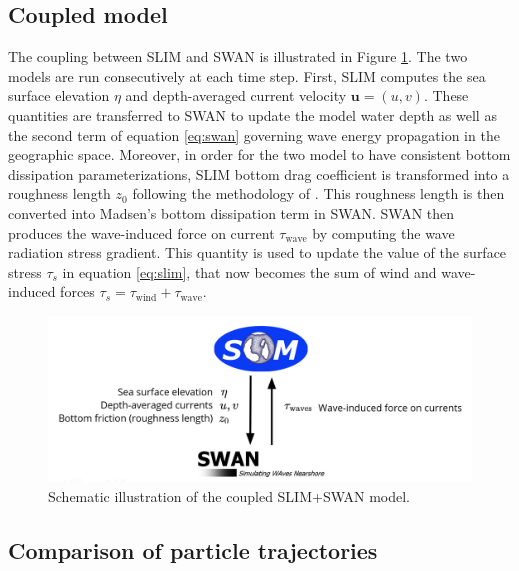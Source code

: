 \documentclass[11pt,a4paper]{article}
\begin{document}
\subsection{Coupled model}
The coupling between SLIM and SWAN is illustrated in Figure \ref{fig:coupling}. The two models are run consecutively at each time step. First, SLIM computes the sea surface elevation $\eta$ and depth-averaged current velocity $\mathbf{u}=(u,v)$. These quantities are transferred to SWAN to update the model water depth as well as the second term of equation \ref{eq:swan} governing wave energy propagation in the geographic space. Moreover, in order for the two model to have consistent bottom dissipation parameterizations, SLIM bottom drag coefficient is transformed into a roughness length $z_0$ following the methodology of \cite{dietrich2011hurricane}. This roughness length is then converted into Madsen's bottom dissipation term in SWAN. SWAN then produces the wave-induced force on current {\boldmath$\tau$}$_\text{wave}$ by computing the wave radiation stress gradient. This quantity is used to update the value of the surface stress {\boldmath$\tau$}$_s$ in equation \ref{eq:slim}, that now becomes the sum of wind and wave-induced forces {\boldmath$\tau$}$_s=${\boldmath$\tau$}$_\text{wind}+${\boldmath$\tau$}$_\text{wave}$.
\begin{figure}
    \centering
    \includegraphics[width=.95\textwidth]{fig/coupling.png}
    \caption{Schematic illustration of the coupled SLIM+SWAN model.}
    \label{fig:coupling}
\end{figure}

\subsection{Comparison of particle trajectories}
\end{document}
